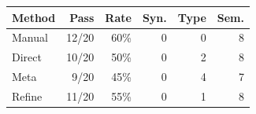 \begin{tabular}{lrrrrr}
\toprule
Method & Pass & Rate & Syn. & Type & Sem. \\
\midrule
Manual & 12/20 & 60\% & 0 & 0 & 8 \\
Direct & 10/20 & 50\% & 0 & 2 & 8 \\
Meta & 9/20 & 45\% & 0 & 4 & 7 \\
Refine & 11/20 & 55\% & 0 & 1 & 8 \\
\bottomrule
\end{tabular}

